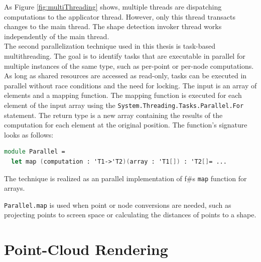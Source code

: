 As Figure \ref{fig:multiThreading} shows, multiple threads are dispatching computations to the applicator thread. However, only this thread transacts changes to the main thread. The shape detection invoker thread works independently of the main thread. 
\\

The second parallelization technique used in this thesis is task-based multithreading. The goal is to identify tasks that are executable in parallel for multiple instances of the same type, such as per-point or per-node computations. As long as shared resources are accessed as read-only, tasks can be executed in parallel without race conditions and the need for locking. The input is an array of elements and a mapping function. The mapping function is executed for each element of the input array using the \verb|System.Threading.Tasks.Parallel.For| statement. The return type is a new array containing the results of the computation for each element at the original position. The function's signature looks as follows: 
\\
\begin{lstlisting}[language = FSharp]
module Parallel = 
  let map (computation : 'T1->'T2)(array : 'T1[]) : 'T2[]= ...
\end{lstlisting}
The technique is realized as an parallel implementation of f\#s \verb|map| function for arrays. 

\verb|Parallel.map| is used when point or node conversions are needed, such as projecting points to screen space or calculating the distances of points to a shape. 


\section{Point-Cloud Rendering}
\label{sec:rendering}

